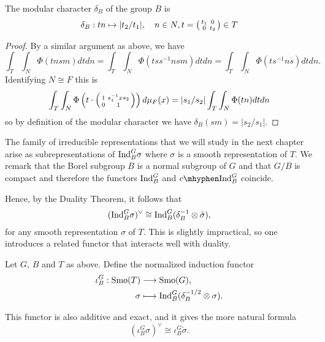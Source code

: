 \begin{prop}\label{prop:modularchar}
    The modular character $\delta_B$ of the group $B$ is
    $$\delta_B : tn \mapsto |t_2/t_1|, \quad n \in N, t = \begin{psmallmatrix}
        t_1 & 0 \\ 0 & t_2
    \end{psmallmatrix} \in T$$
\end{prop}
\begin{proof}
    By a similar argument as above, we have
    $$\int_T\int_N \Phi(tnsm) dtdn = \int_T\int_N \Phi(tss^{-1}nsm)dtdn = \int_T\int_N \Phi(ts^{-1}ns) dt dn.$$ Identifying $N \cong F$ this is
    $$\int_T\int_N \Phi\left(t \cdot \begin{psmallmatrix}
        1 & s_1^{-1}xs_2 \\0&1 
    \end{psmallmatrix}\right) d\mu_F(x) = |s_1/s_2|\int_T\int_N\Phi(tn)dtdn$$
    so by definition of the modular character we have $\delta_B(sm) = |s_2/s_1|$.
\end{proof}

The family of irreducible representations that we will study in the next chapter arise as subrepresentations of $\mathrm{Ind}_B^G\sigma$ where $\sigma$ is a smooth representation of $T$. We remark that the Borel subgroup $B$ is a normal subgroup of $G$ and that $G/B$ is compact and therefore the functors $\mathrm{Ind}_B^G$ and $\cInd_B^G$ coincide.

Hence, by the Duality Theorem, it follows that 
$$(\mathrm{Ind}_B^G\sigma)^\vee\cong\mathrm{Ind}_B^G(\delta_B^{-1}\otimes\check{\sigma}),$$
for any smooth representation $\sigma$ of $T$. This is slightly impractical, so one introduces a related functor that interacts well with duality.

\begin{defn}
    Let $G$, $B$ and $T$ as above. Define the normalized induction functor 
    \begin{align*}
        \iota_B^G:\mathrm{Smo}(T)&\longrightarrow\mathrm{Smo}(G),\\
        \sigma&\longmapsto\mathrm{Ind}_B^G(\delta_B^{-1/2}\otimes\sigma).
    \end{align*}
\end{defn}
This functor is also additive and exact, and it gives the more natural formula
$$(\iota_B^G\sigma)^\vee\cong\iota_B^G\check{\sigma}.$$
